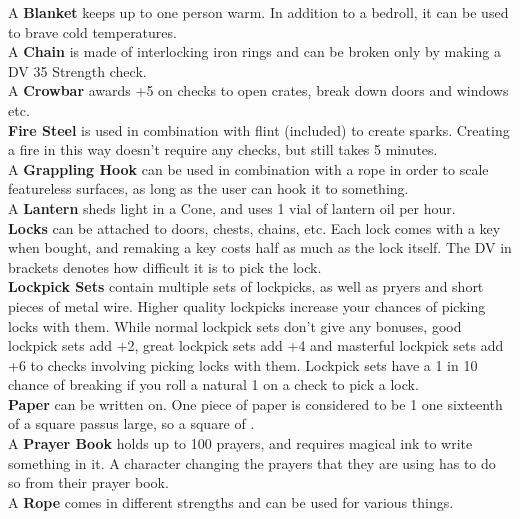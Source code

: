 A \textbf{Blanket} keeps up to one person warm.
In addition to a bedroll, it can be used to brave cold temperatures.\\

A \textbf{Chain} is made of interlocking iron rings and can be broken only by making a DV 35 Strength check.\\

A \textbf{Crowbar} awards +5 on checks to open crates, break down doors and windows etc.\\

\textbf{Fire Steel} is used in combination with flint (included) to create sparks.
Creating a fire in this way doesn't require any checks, but still takes 5 minutes.\\

A \textbf{Grappling Hook} can be used in combination with a rope in order to scale featureless surfaces, as long as the user can hook it to something.\\

A \textbf{Lantern} sheds light in a  Cone, and uses 1 vial of lantern oil per hour.\\

\textbf{Locks} can be attached to doors, chests, chains, etc.
Each lock comes with a key when bought, and remaking a key costs half as much as the lock itself.
The DV in brackets denotes how difficult it is to pick the lock.\\

\textbf{Lockpick Sets} contain multiple sets of lockpicks, as well as pryers and short pieces of metal wire.
Higher quality lockpicks increase your chances of picking locks with them.
While normal lockpick sets don't give any bonuses, good lockpick sets add +2, great lockpick sets add +4 and masterful lockpick sets add +6 to checks involving picking locks with them.
Lockpick sets have a 1 in 10 chance of breaking if you roll a natural 1 on a check to pick a lock.\\

\textbf{Paper} can be written on.
One piece of paper is considered to be 1 one sixteenth of a square passus large, so a square of  .\\

A \textbf{Prayer Book} holds up to 100 prayers, and requires magical ink to write something in it.
A character changing the prayers that they are using has to do so from their prayer book.\\

A \textbf{Rope} comes in different strengths and can be used for various things.\\

